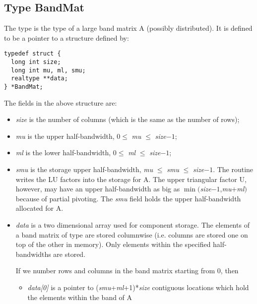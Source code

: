 \subsection{Type BandMat}
The type  is the type of a large band matrix A (possibly distributed). 
It is defined to be a pointer to a structure defined by:
\begin{verbatim}
typedef struct {
  long int size;
  long int mu, ml, smu;
  realtype **data;
} *BandMat;
\end{verbatim}
The fields in the above structure are:
\begin{itemize}

\item {\em size} is the number of columns (which is the same as the number of  rows);
                                                                  
\item {\em mu} is the upper half-bandwidth, $0 \le$ {\em mu} $\le$ {\em size}$-1$;

\item {\em ml} is the lower half-bandwidth, $0 \le$ {\em ml} $\le$ {\em size}$-1$;

\item {\em smu} is the storage upper half-bandwidth, 
  {\em mu} $\le$ {\em smu} $\le$ {\em size}$-1$.      
  The  routine writes the LU factors           
  into the storage for A. The upper triangular factor U, 
  however, may have an upper half-bandwidth as big as         
  $\min(${\em size}$-1$,{\em mu}$+${\em ml}$)$
  because of partial pivoting. The {\em smu} field holds the upper 
  half-bandwidth allocated for A.       
  
\item {\em data} is a two dimensional array used for component storage.    
  The elements of a band matrix of type  are      
  stored columnwise (i.e. columns are stored one on top  
  of the other in memory). Only elements within the      
  specified half-bandwidths are stored.                       
                                                                 
  If we number rows and columns in the band matrix starting      
  from $0$, then                                                   
  \begin{itemize}
  \item {\em data[0]} is a pointer to 
    ({\em smu}+{\em ml}+1)*{\em size} contiguous locations   
    which hold the elements within the band of A        
    

\end{itemize}
\end{itemize}
